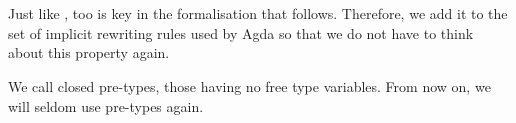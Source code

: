 \begin{code}[hide]
\AgdaSymbol{\}}\AgdaSpace{}%
\AgdaSymbol{\{}\AgdaSymbol{\})}\<%
\\
\>[0]\AgdaSpace{}%
\AgdaSymbol{\{\AgdaUnderscore{}\}}\AgdaSpace{}%
\AgdaSymbol{\{\AgdaUnderscore{}\}}\AgdaSpace{}%
\AgdaSymbol{\{}\AgdaSymbol{\}}\AgdaSpace{}%
\AgdaSymbol{\{}\AgdaSpace{}%
\AgdaSymbol{\}}\AgdaSpace{}%
\AgdaSymbol{=}\AgdaSpace{}%
\AgdaSpace{}%
\AgdaSpace{}%
\AgdaSymbol{(}\AgdaSpace{}%
\AgdaSymbol{\{}\AgdaSpace{}%
\AgdaSymbol{=}\AgdaSpace{}%
\AgdaSymbol{\}}\AgdaSpace{}%
\AgdaSymbol{\{}\AgdaSymbol{\})}\<%
\\
\>[0]\AgdaSpace{}%
\AgdaSymbol{\{\AgdaUnderscore{}\}}\AgdaSpace{}%
\AgdaSymbol{\{\AgdaUnderscore{}\}}\AgdaSpace{}%
\AgdaSymbol{\{}\AgdaSymbol{\}}\AgdaSpace{}%
\AgdaSymbol{\{}\AgdaSpace{}%
\AgdaSymbol{\}}\AgdaSpace{}%
\AgdaSymbol{=}\AgdaSpace{}%
\AgdaSpace{}%
\AgdaSpace{}%
\AgdaSymbol{(}\AgdaSpace{}%
\AgdaSymbol{\{}\AgdaSpace{}%
\AgdaSymbol{=}\AgdaSpace{}%
\AgdaSymbol{\}}\AgdaSpace{}%
\AgdaSymbol{\{}\AgdaSymbol{\})}\<%
\end{code}

Just like ,  too is key in the
formalisation that follows. Therefore, we add it to the set of implicit
rewriting rules used by Agda so that we do not have to think about this property
again.

\begin{code}%
\>[0]\AgdaSymbol{\{-\#}\AgdaSpace{}%
\AgdaSpace{}%
\AgdaSpace{}%
\AgdaSymbol{\#-\}}\<%
\end{code}

We call  closed pre-types, those having no free type
variables. From now on, we will seldom use pre-types again.

\begin{code}%
\>[0]\AgdaSpace{}%
\AgdaSymbol{:}\AgdaSpace{}%
\<%
\\
\>[0]\AgdaSpace{}%
\AgdaSymbol{=}\AgdaSpace{}%
\AgdaSpace{}%
\<%
\end{code}
